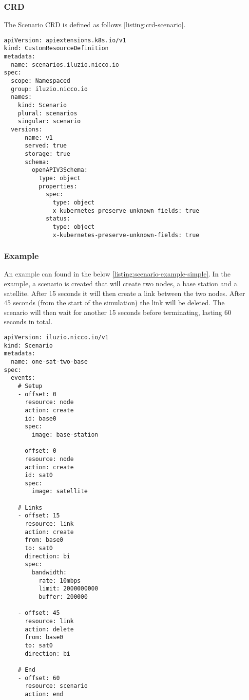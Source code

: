 \subsubsection{CRD}

The Scenario CRD is defined as follows \ref{listing:crd-scenario}.

\begin{listing}[H]
  \begin{verbatim}
apiVersion: apiextensions.k8s.io/v1
kind: CustomResourceDefinition
metadata:
  name: scenarios.iluzio.nicco.io
spec:
  scope: Namespaced
  group: iluzio.nicco.io
  names:
    kind: Scenario
    plural: scenarios
    singular: scenario
  versions:
    - name: v1
      served: true
      storage: true
      schema:
        openAPIV3Schema:
          type: object
          properties:
            spec:
              type: object
              x-kubernetes-preserve-unknown-fields: true
            status:
              type: object
              x-kubernetes-preserve-unknown-fields: true
\end{verbatim}
  \caption{Scenario CRD}
  \label{listing:crd-scenario}
\end{listing}

\subsubsection{Example}

An example can found in the below \ref{listing:scenario-example-simple}. In the example, a scenario is created that will create two nodes, a base station and a satellite. After 15 seconds it will then create a link between the two nodes. After 45 seconds (from the start of the simulation) the link will be deleted. The scenario will then wait for another 15 seconds before terminating, lasting 60 seconds in total.

\begin{listing}[H]
  \begin{verbatim}
apiVersion: iluzio.nicco.io/v1
kind: Scenario
metadata:
  name: one-sat-two-base
spec:
  events:
    # Setup
    - offset: 0
      resource: node
      action: create
      id: base0
      spec:
        image: base-station

    - offset: 0
      resource: node
      action: create
      id: sat0
      spec:
        image: satellite

    # Links
    - offset: 15
      resource: link
      action: create
      from: base0
      to: sat0
      direction: bi
      spec:
        bandwidth:
          rate: 10mbps
          limit: 2000000000
          buffer: 200000

    - offset: 45
      resource: link
      action: delete
      from: base0
      to: sat0
      direction: bi

    # End
    - offset: 60
      resource: scenario
      action: end
\end{verbatim}
  \caption{Example Scenario CRD}
  \label{listing:scenario-example-simple}
\end{listing}

